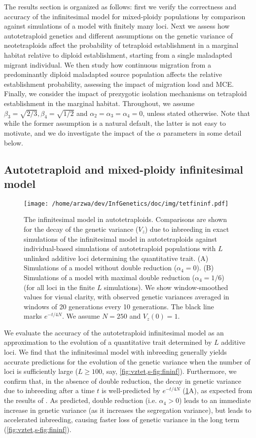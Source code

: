 \documentclass[12pt,a4paper]{article}
\begin{document}
The results section is organized as follows: first we verify the correctness
and accuracy of the infinitesimal model for mixed-ploidy populations by
comparison against simulations of a model with finitely many loci.
Next we assess how autotetraploid genetics and different assumptions on the
genetic variance of neotetraploids affect the probability of tetraploid
establishment in a marginal habitat relative to diploid establishment, starting
from a single maladapted migrant individual.
We then study how continuous migration from a predominantly diploid maladapted
source population affects the relative establishment probability, assessing the
impact of migration load and MCE.
Finally, we consider the impact of prezygotic isolation mechanisms on
tetraploid establishment in the marginal habitat.
Throughout, we assume $\beta_3 = \sqrt{2/3}, \beta_4=\sqrt{1/2}$
and $\alpha_2 = \alpha_3 = \alpha_4 = 0$, unless stated otherwise.
Note that while the former assumption is a natural default, the latter is not
easy to motivate, and we do investigate the impact of the $\alpha$ parameters
in some detail below.

\subsection*{Autotetraploid and mixed-ploidy infinitesimal model}

\begin{figure}[t]
\centering
\texttt{[image: /home/arzwa/dev/InfGenetics/doc/img/tetfininf.pdf]}
\caption{
The infinitesimal model in autotetraploids.
Comparisons are shown for the decay of the genetic variance ($V_z$) due to
inbreeding in exact simulations of the infinitesimal model in autotetraploids
against individual-based simulations of autotetraploid populations with $L$
unlinked additive loci determining the quantitative trait. 
(A) Simulations of a model without double reduction ($\alpha_4=0$).
(B) Simulations of a model with maximal double reduction ($\alpha_4=1/6$) (for
all loci in the finite $L$ simulations).
We show window-smoothed values for visual clarity, with observed genetic
variances averaged in windows of 20 generations every 10 generations.
The black line marks $e^{-t/4N}$. 
We assume $N=250$ and $V_z(0) = 1$.
\label{fig:vztet}}
\end{figure}

We evaluate the accuracy of the autotetraploid infinitesimal model as an
approximation to the evolution of a quantitative trait determined by $L$
additive loci.
We find that the infinitesimal model with inbreeding generally yields accurate
predictions for the evolution of the genetic variance when the number of loci
is sufficiently large ($L \ge 100$, say, \cref{fig:vztet,s-fig:fininf}).
Furthermore, we confirm that, in the absence of double reduction, the decay in
genetic variance due to inbreeding after a time $t$ is well-predicted by
$e^{-t/4N}$ (\cref{fig:vztet}A), as expected from the results of \cite{arnold2012}.
As predicted, double reduction (i.e. $\alpha_4 > 0$) leads to an immediate
increase in genetic variance (as it increases the segregation variance), but
leads to accelerated inbreeding, causing faster loss of genetic variance in the
long term (\cref{fig:vztet,s-fig:fininf}).
\end{document}
